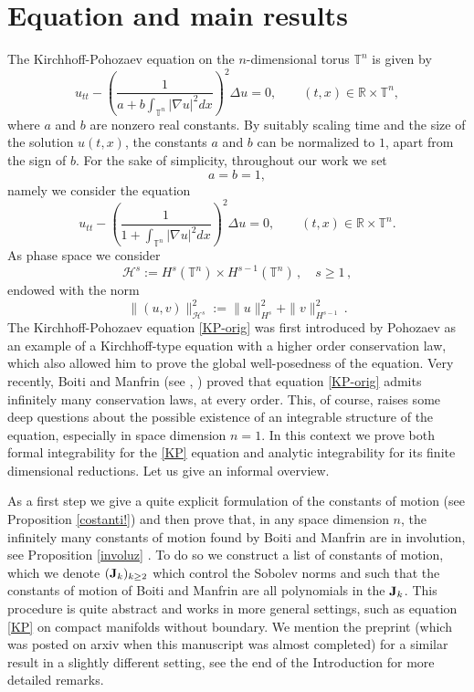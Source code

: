 \documentclass[reqno,11pt]{amsart}
\theoremstyle{plain}
\numberwithin{equation}{section}
\newcommand{\R}{\mathbb{R}}
\newcommand{\T}{\mathbb{T}}
\renewcommand{\H}{\mathcal{H}}
\newcommand{\I}{{\texttt{\bf J}}}
\newcommand{\J}{{\texttt{\bf J}}}
\begin{document}
\section{Equation and main results}
The Kirchhoff-Pohozaev equation on the $n$-dimensional torus $\T^n$ is given by
\begin{equation}\label{KP-orig}
	u_{tt}-\left(\dfrac{1}{a+b\int_{\T^n}|\nabla u|^2dx}\right)^2\Delta u=0, \qquad (t,x) \in \R\times\T^n, 
\end{equation}
where $a$ and $b$ are nonzero real constants. By suitably scaling time and the size of the solution $u(t,x)$, the constants $a$ and $b$ can be normalized to $1$, apart from the sign of $b$. For the sake of simplicity, throughout our work we set $$a = b = 1,$$
namely we  consider the equation
\begin{equation}\label{KP}
	u_{tt}-\left(\dfrac{1}{1+\int_{\T^n}|\nabla u|^2dx}\right)^2\Delta u=0, \qquad (t,x) \in \R\times\T^n.
\end{equation}
As phase space we consider 
\begin{equation}\label{phase space}
	{\mathcal H}^s:= H^s(\T^n) \times H^{s-1}(\T^n)\,,\quad s\geq 1\,,
\end{equation}
endowed with the norm
\begin{equation}\label{normuv}
	\|(u,v)\|_{\H^s}^2:= \|u\|_{H^s}^2+  \|v\|_{H^{s-1}}^2\,.
\end{equation}
The Kirchhoff-Pohozaev equation \eqref{KP-orig} was first introduced by Pohozaev \cite{P2} as an example of a Kirchhoff-type equation with a higher order conservation law, which also allowed him to prove the global well-posedness of the equation.
Very recently, Boiti and Manfrin (see \cite{BoitiManfrin2025}, \cite{BoitiManfrin2026}) proved that equation \eqref{KP-orig} admits infinitely many conservation laws, at every order.
This, of course, raises some deep questions about the possible existence of an integrable structure of the equation, especially in space dimension $n=1$. In this context we prove both  formal integrability for the \eqref{KP} equation and analytic integrability for its finite dimensional reductions.
Let us give an informal overview.

As a first step we  give a quite explicit formulation of the constants of motion (see Proposition \ref{costanti!}) and then prove that, in any space dimension $n$, the infinitely many constants of motion found by Boiti and Manfrin are in involution, see Proposition \ref{involuz} . To do so we construct a list of constants of motion, which we denote $(\I_k)_{k\geq 2}$ which control the Sobolev norms and such that the constants of motion of Boiti and Manfrin are all polynomials in the $\J_k$. This procedure is quite abstract and works in more general settings, such as equation \eqref{KP} on compact manifolds without boundary. We mention the  preprint \cite{campos} (which was posted on arxiv  when this manuscript  was almost completed) for a similar result in a slightly different setting, see the end of the Introduction for more detailed remarks. 
\end{document}
